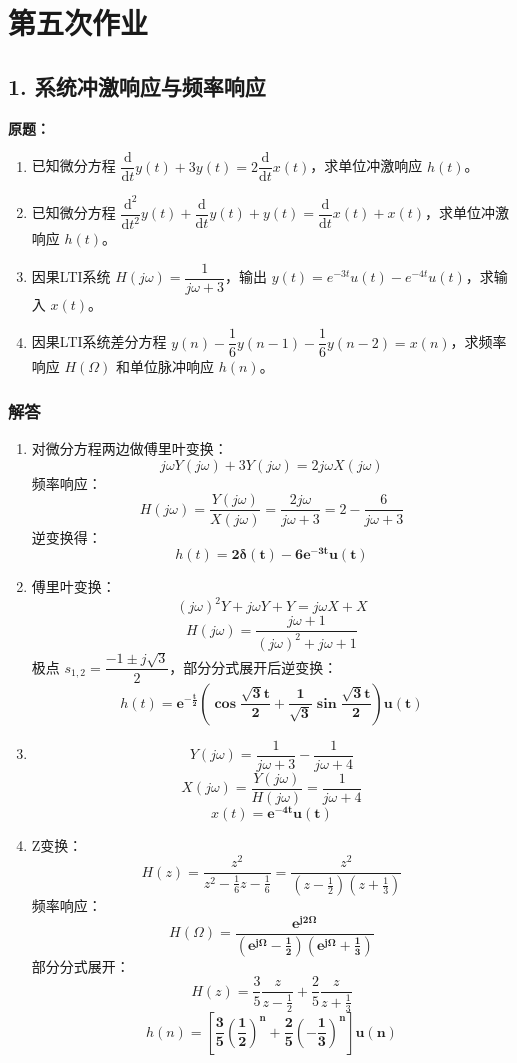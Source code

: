\section{第五次作业}

\subsection{1. 系统冲激响应与频率响应}
\noindent\textbf{原题：}
\begin{enumerate}[label=(\arabic*)]
    \item 已知微分方程 $\dfrac{\mathrm{d}}{\mathrm{d} t}y(t) + 3y(t) = 2\dfrac{\mathrm{d}}{\mathrm{d} t}x(t)$，求单位冲激响应 $h(t)$。
    \item 已知微分方程 $\dfrac{\mathrm{d}^2}{\mathrm{d} t^2}y(t) + \dfrac{\mathrm{d}}{\mathrm{d} t}y(t) + y(t) = \dfrac{\mathrm{d}}{\mathrm{d} t}x(t) + x(t)$，求单位冲激响应 $h(t)$。
    \item 因果LTI系统 $H(j\omega) = \dfrac{1}{j\omega+3}$，输出 $y(t)=e^{-3t}u(t)-e^{-4t}u(t)$，求输入 $x(t)$。
    \item 因果LTI系统差分方程 $y(n)-\dfrac{1}{6}y(n-1)-\dfrac{1}{6}y(n-2)=x(n)$，求频率响应 $H(\Omega)$ 和单位脉冲响应 $h(n)$。
\end{enumerate}

\subsubsection{解答}
\begin{enumerate}[label=(\arabic*)]
    \item
    对微分方程两边做傅里叶变换：
    \[
    j\omega Y(j\omega) + 3Y(j\omega) = 2j\omega X(j\omega)
    \]
    频率响应：
    \[
    H(j\omega) = \frac{Y(j\omega)}{X(j\omega)} = \frac{2j\omega}{j\omega+3} = 2 - \frac{6}{j\omega+3}
    \]
    逆变换得：
    \[
    h(t) = \boldsymbol{2\delta(t) - 6e^{-3t}u(t)}
    \]

    \item
    傅里叶变换：
    \[
    (j\omega)^2 Y + j\omega Y + Y = j\omega X + X
    \]
    \[
    H(j\omega) = \frac{j\omega+1}{(j\omega)^2+j\omega+1}
    \]
    极点 $s_{1,2}=\dfrac{-1\pm j\sqrt{3}}{2}$，部分分式展开后逆变换：
    \[
    h(t) = \boldsymbol{e^{-\frac{t}{2}} \left( \cos\frac{\sqrt{3}t}{2} + \frac{1}{\sqrt{3}}\sin\frac{\sqrt{3}t}{2} \right) u(t)}
    \]

    \item
    \[
    Y(j\omega) = \frac{1}{j\omega+3} - \frac{1}{j\omega+4}
    \]
    \[
    X(j\omega) = \frac{Y(j\omega)}{H(j\omega)} = \frac{1}{j\omega+4}
    \]
    \[
    x(t) = \boldsymbol{e^{-4t}u(t)}
    \]

    \item
    Z变换：
    \[
    H(z) = \frac{z^2}{z^2-\frac16 z-\frac16} = \frac{z^2}{\left(z-\frac12\right)\left(z+\frac13\right)}
    \]
    频率响应：
    \[
    H(\Omega) = \boldsymbol{\frac{e^{j2\Omega}}{\left(e^{j\Omega}-\frac12\right)\left(e^{j\Omega}+\frac13\right)}}
    \]
    部分分式展开：
    \[
    H(z) = \frac35\frac{z}{z-\frac12}+\frac25\frac{z}{z+\frac13}
    \]
    \[
    h(n) = \boldsymbol{\left[ \frac35\left(\frac12\right)^n + \frac25\left(-\frac13\right)^n \right] u(n)}
    \]
\end{enumerate}

